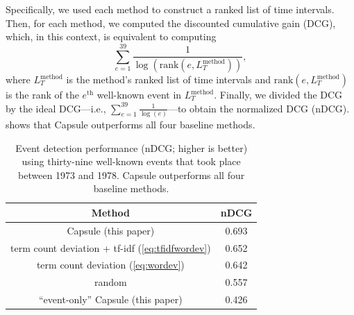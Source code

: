 Specifically, we used each method to construct a ranked list of time
intervals. Then, for each method, we computed the discounted
cumulative gain (DCG), which, in this context, is equivalent to
computing
\begin{equation}
  \sum_{e=1}^{39} \frac{1}{\log{\left(\textrm{rank}\left(e, L_T^{\textrm{method}}\right)\right)}},
\end{equation}
where $L_T^{\textrm{method}}$ is the method's ranked list of time
intervals and $\textrm{rank}\left(e, L_T^{\textrm{method}}\right)$ is
the rank of the $e^{\textrm{th}}$ well-known event in
$L_T^{\textrm{method}}$. Finally, we divided the DCG by the ideal
DCG---i.e., $\sum_{e=1}^{39} \frac{1}{\log{\left(e\right)}}$---to
obtain the normalized DCG (nDCG).  shows that
Capsule outperforms all four baseline methods.

\begin{table}[t]
\centering
\small
\begin{tabular}{cc}
\toprule
\textbf{Method} & \textbf{nDCG} \\
\midrule
Capsule (this paper) & 0.693 \\
term count deviation + tf-idf (\cref{eq:tfidfwordev}) & 0.652 \\
term count deviation (\cref{eq:wordev}) & 0.642 \\
random & 0.557\\
``event-only'' Capsule (this paper) & 0.426\\
\bottomrule
\end{tabular}
\caption{Event detection performance (nDCG; higher is better) using
  thirty-nine well-known events that took place between 1973 and 1978.
  Capsule outperforms all four baseline methods.}
\label{table:cables:ndcg}
\end{table}


